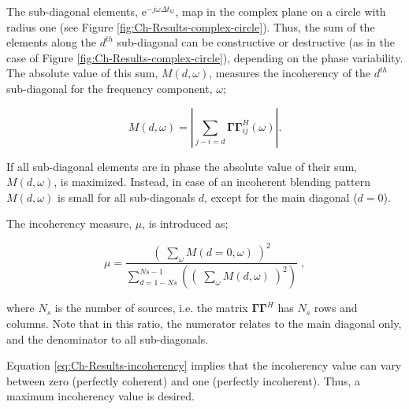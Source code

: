 The sub-diagonal elements, $\mathrm{e}^{-j \omega \Delta t_{kl}}$, map in the complex plane on a circle with radius one (see Figure \ref{fig:Ch-Results-complex-circle}). Thus, the sum of the elements along the $d^{th}$ sub-diagonal can be constructive or destructive (as in the case of Figure \ref{fig:Ch-Results-complex-circle}), depending on the phase variability. The absolute value of this sum, $M(d,\omega)$, measures the incoherency of the $d^{th}$ sub-diagonal for the frequency component, $\omega$;

\begin{equation}
	M(d,\omega) = \left| \sum_{j-i=d} \mathbf{\Gamma \Gamma}^H_{ij} (\omega) \right|.
	\label{eq:Ch-Results-incoherency-diagsum}	
\end{equation} 

If all sub-diagonal elements are in phase the absolute value of their sum, $M(d,\omega)$, is maximized. Instead, in case of an incoherent blending pattern $M(d,\omega)$ is small for all sub-diagonals $d$, except for the main diagonal ($d = 0$).  

The incoherency measure, $\mu$, is introduced as;

\begin{equation}
	\mu = \frac{\left( \; \sum_{\omega}M(d=0,\omega) \; \right)^2}{\sum_{d = 1-Ns}^{Ns-1} \left(\left( \; \sum_{\omega}M(d,\omega) \; \right)^2\right)} \; ,
	\label{eq:Ch-Results-incoherency}
\end{equation}

where $N_s$ is the number of sources, i.e. the matrix $\mathbf{\Gamma \Gamma}^H$ has $N_s$ rows and columns. Note that in this ratio, the numerator relates to the main diagonal only, and the denominator to all sub-diagonals.

Equation \ref{eq:Ch-Results-incoherency} implies that the incoherency value can vary between zero (perfectly coherent) and one (perfectly incoherent). Thus, a maximum incoherency value is desired.



